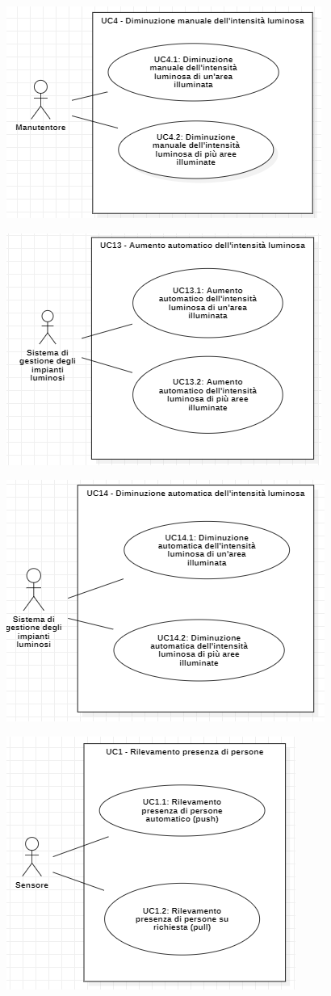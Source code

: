\documentclass[a4paper, 12pt]{article}
\begin{document}
\includegraphics[scale=0.7]{diagramma_use_case_7.png}

\includegraphics[scale=0.7]{diagramma_use_case_8.png}

\includegraphics[scale=0.7]{diagramma_use_case_9.png}

\includegraphics[scale=0.60]{diagramma_use_case_10.png}
\end{document}
